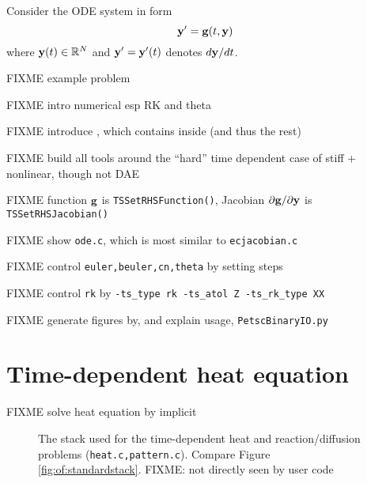 Consider the ODE system in form
\begin{equation}
\mathbf{y}' = \mathbf{g}(t,\mathbf{y}) \label{eq:ts:ode}
\end{equation}
where $\mathbf{y}(t) \in \mathbb{R}^N$ and $\mathbf{y}'=\mathbf{y}'(t)$ denotes $d\mathbf{y}/dt$.

FIXME example problem

FIXME intro numerical esp RK and theta \citep{AscherPetzold1998}

FIXME introduce \pTS, which contains \pSNES inside (and thus the rest)

FIXME build all tools around the ``hard'' time dependent case of stiff + nonlinear, though not DAE

FIXME function $\mathbf{g}$ is \texttt{TSSetRHSFunction()}, Jacobian $\partial \mathbf{g}/\partial \mathbf{y}$ is \texttt{TSSetRHSJacobian()}

FIXME show \texttt{ode.c}, which is most similar to \texttt{ecjacobian.c}



FIXME control \texttt{euler,beuler,cn,theta} by setting steps

FIXME control \texttt{rk} by \texttt{-ts\_type rk -ts\_atol Z -ts\_rk\_type XX}

FIXME generate figures by, and explain usage, \texttt{PetscBinaryIO.py}

\section{Time-dependent heat equation}

FIXME solve heat equation by implicit






\begin{figure}
\caption{The \PETSc stack used for the time-dependent heat and reaction/diffusion problems (\texttt{heat.c,pattern.c}).  Compare Figure \ref{fig:of:standardstack}.  FIXME: \pSNES not directly seen by user code}
\label{fig:of:tsstack}
\end{figure}

